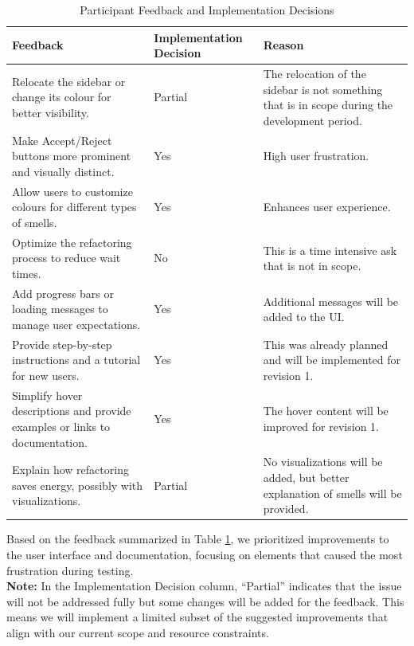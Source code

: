 \documentclass[12pt, titlepage]{article}
\begin{document}
\begin{table}[H]
  \centering
  \begin{tabular}{>{\raggedright\arraybackslash}p{6cm}p{3.2cm}>{\raggedright\arraybackslash}p{5cm}}
    \toprule \textbf{Feedback} & \textbf{Implementation Decision} &
    \textbf{Reason} \\
    \midrule
    Relocate the sidebar or change its colour for better visibility.
    & Partial & The relocation of the sidebar is not something that
    is in scope during the development period. \\
    Make Accept/Reject buttons more prominent and visually distinct.
    & Yes & High user frustration. \\
    Allow users to customize colours for different types of smells. &
    Yes & Enhances user experience. \\
    Optimize the refactoring process to reduce wait times. & No &
    This is a time intensive ask that is not in scope. \\
    Add progress bars or loading messages to manage user
    expectations. & Yes & Additional messages will be added to the UI.\\
    Provide step-by-step instructions and a tutorial for new users. &
    Yes & This was already planned and will be implemented for revision 1. \\
    Simplify hover descriptions and provide examples or links to
    documentation. & Yes & The hover content will be improved for revision 1. \\
    Explain how refactoring saves energy, possibly with
    visualizations. & Partial & No visualizations will be added, but
    better explanation of smells will be provided. \\
    \bottomrule
  \end{tabular}
  \caption{Participant Feedback and Implementation Decisions}
  \label{tab:participant-feedback}
\end{table}

Based on the feedback summarized in Table \ref{tab:participant-feedback}, we prioritized improvements to the user interface and documentation, focusing on elements that caused the most frustration during testing.\\
\noindent \textbf{Note:} In the Implementation Decision column, ``Partial'' indicates that the issue will not be addressed fully but some changes will be added for the feedback. This means we will implement a limited subset of the suggested improvements that align with our current scope and resource constraints.
\end{document}
